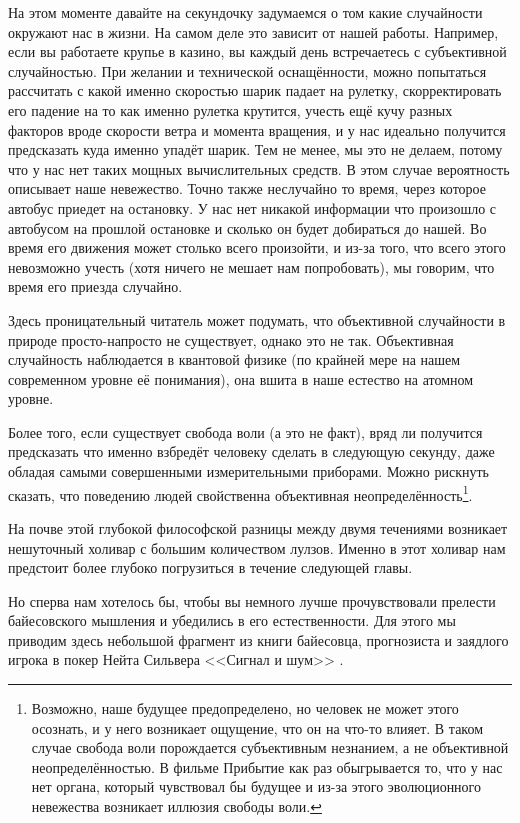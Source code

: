 \documentclass[12pt, a4paper, oneside]{extreport}
\theoremstyle{plain}              %
\theoremstyle{definition}         %
\begin{document}
На этом моменте давайте на секундочку задумаемся о том какие случайности окружают нас в жизни. На самом деле это зависит от нашей работы. Например, если вы работаете крупье в казино, вы каждый день встречаетесь с субъективной случайностью. При желании и технической оснащённости, можно попытаться рассчитать с какой именно скоростью шарик падает на рулетку, скорректировать его падение на то как именно рулетка крутится, учесть ещё кучу разных факторов вроде скорости ветра и момента вращения, и у нас идеально получится предсказать куда именно упадёт шарик. Тем не менее, мы это не делаем, потому что у нас нет таких мощных вычислительных средств. В этом случае вероятность описывает наше невежество. Точно также неслучайно то время, через которое автобус приедет на остановку. У нас нет никакой информации что произошло с автобусом  на прошлой остановке и сколько он будет добираться до нашей. Во время его движения может столько всего произойти, и из-за того, что всего этого невозможно учесть (хотя ничего не мешает нам попробовать), мы говорим, что время его приезда случайно.

Здесь проницательный читатель может подумать, что объективной случайности в природе просто-напросто не существует, однако это не так. Объективная случайность наблюдается в квантовой физике (по крайней мере на нашем современном уровне её понимания), она вшита в наше естество на атомном уровне. 

Более того, если существует свобода воли (а это не факт), вряд ли получится предсказать что именно взбредёт человеку сделать в следующую секунду, даже обладая самыми совершенными измерительными приборами. Можно рискнуть сказать, что поведению людей свойственна объективная неопределённость\footnote{Возможно, наше будущее предопределено, но человек не может этого осознать, и у него возникает ощущение, что он на что-то влияет. В таком случае свобода воли порождается субъективным незнанием, а не объективной неопределённостью. В фильме Прибытие как раз обыгрывается то, что у нас нет органа, который чувствовал бы будущее и из-за этого эволюционного невежества возникает иллюзия свободы воли.}.

На почве этой глубокой философской разницы между двумя течениями возникает нешуточный холивар с большим количеством лулзов. Именно в этот холивар нам предстоит более глубоко погрузиться в течение следующей главы.

Но сперва нам хотелось бы, чтобы вы немного лучше прочувствовали прелести байесовского мышления и убедились в его естественности. Для этого мы приводим здесь небольшой фрагмент из книги байесовца, прогнозиста и заядлого игрока в покер Нейта Сильвера <<Сигнал и шум>> \cite{silver2012signal}.
\end{document}
